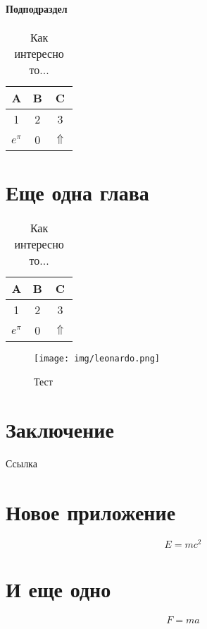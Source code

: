 \documentclass[12pt, rusmathsym]{nirreport}
\begin{document}
\subsubsection{Подподраздел}

\lipsum[1]

\begin{table}[ht]
  \caption{Как интересно то...}
  \centering
  \begin{tabular}{ccc} \hline
    A           & B & C            \\ \hline
    1           & 2 & 3            \\
    \(e^{\pi}\) & 0 & \(\Uparrow\) \\ \hline
  \end{tabular}
\end{table}

\chapter{Еще одна глава}

\lipsum[1]

\begin{table}[!ht]
  \caption{Как интересно то...}
  \centering
  \begin{tabular}{ccc} \hline
    A           & B & C            \\ \hline
    1           & 2 & 3            \\
    \(e^{\pi}\) & 0 & \(\Uparrow\) \\ \hline
  \end{tabular}
\end{table}

\lipsum[1]

\begin{figure}[!ht]
  \begin{center}
    \texttt{[image: img/leonardo.png]}
  \end{center}
  \caption{Тест}
\end{figure}

\chapter*{Заключение}

Ссылка~\cite{Pup09}

\lipsum[1]

% 
% 
\printbibliography

\appendix

\chapter{Новое приложение}

\[ E = m c^2 \]

\chapter{И еще одно}

\[ F = m a \]
\end{document}
